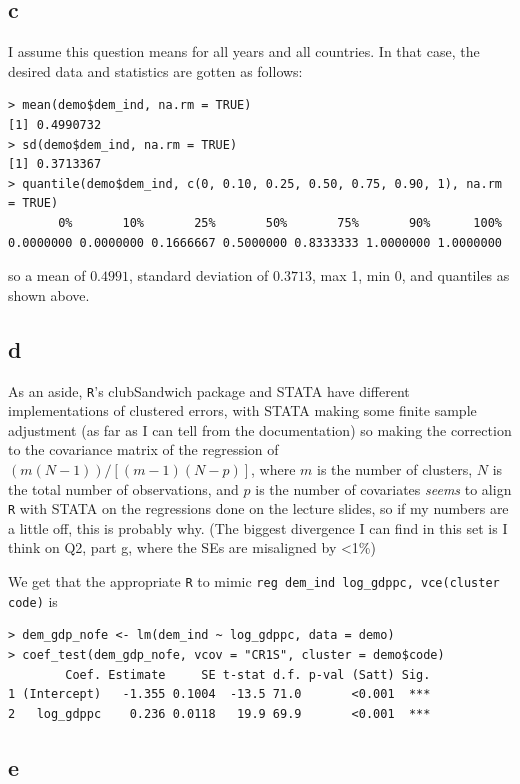 \documentclass[12pt,letterpaper]{article}
\theoremstyle{definition}
\begin{document}
\subsection*{c}

I assume this question means for all years and all countries. In that case, the desired data and statistics are gotten as follows:
\begin{Verbatim}[fontsize=\small]
> mean(demo$dem_ind, na.rm = TRUE)
[1] 0.4990732
> sd(demo$dem_ind, na.rm = TRUE)
[1] 0.3713367
> quantile(demo$dem_ind, c(0, 0.10, 0.25, 0.50, 0.75, 0.90, 1), na.rm = TRUE)
       0%       10%       25%       50%       75%       90%      100%
0.0000000 0.0000000 0.1666667 0.5000000 0.8333333 1.0000000 1.0000000
\end{Verbatim}
so a mean of $0.4991$, standard deviation of $0.3713$, max 1, min 0, and quantiles as shown above.

\subsection*{d}

As an aside, \verb|R|'s clubSandwich package and STATA have different implementations of clustered errors, with STATA making some finite sample adjustment (as far as I can tell from the documentation) so making the correction to the covariance matrix of the regression of $(m (N-1)) / [(m - 1)(N - p)]$, where $m$ is the number of clusters, $N$ is the total number of observations, and $p$ is the number of covariates \textit{seems} to align \verb|R| with STATA on the regressions done on the lecture slides, so if my numbers are a little off, this is probably why. (The biggest divergence I can find in this set is I think on Q2, part g, where the SEs are misaligned by <1\%)

We get that the appropriate \verb|R| to mimic \verb|reg dem_ind log_gdppc, vce(cluster code)| is
\begin{Verbatim}[fontsize=\small]
> dem_gdp_nofe <- lm(dem_ind ~ log_gdppc, data = demo)
> coef_test(dem_gdp_nofe, vcov = "CR1S", cluster = demo$code)
        Coef. Estimate     SE t-stat d.f. p-val (Satt) Sig.
1 (Intercept)   -1.355 0.1004  -13.5 71.0       <0.001  ***
2   log_gdppc    0.236 0.0118   19.9 69.9       <0.001  ***
\end{Verbatim}

\subsection*{e}
\end{document}
